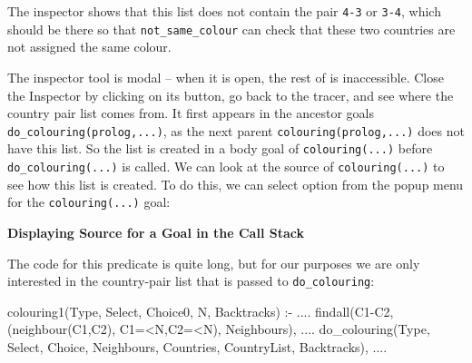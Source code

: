 The inspector shows that this list does not contain the pair \verb'4-3' or
\verb'3-4', which should be there so that \verb'not_same_colour'
can check that these two countries  are not assigned the same colour.

\begin{sloppypar}
The inspector tool is modal -- when it is open, the rest of {\tkeclipse} is
inaccessible. Close the Inspector by clicking on its
 button, go back to the tracer, and see where the country
pair list comes from. It
first appears in 
the ancestor goals \verb'do_colouring(prolog,...)', as the next parent
\verb'colouring(prolog,...)' does not have this list. So the list
is created in a body goal of \verb'colouring(...)' before \verb'do_colouring(...)' is
called. We can look at the source of \verb'colouring(...)'  to see how this
list is created. To do this, we can
select  option from the popup menu for the
\verb'colouring(...)' goal:
\end{sloppypar}
 
\begin{center}

\vspace{3mm}
{\bf Displaying Source for a Goal in the Call Stack}
\end{center}

The code for this predicate is quite long, but for our purposes we are only
interested in the country-pair list that is passed to \verb'do_colouring':

\begin{code}
colouring1(Type, Select, Choice0, N, Backtracks) :-
        ....
        findall(C1-C2, (neighbour(C1,C2), C1=<N,C2=<N), Neighbours),
        ....
        do_colouring(Type, Select, Choice, Neighbours, Countries,
                     CountryList, Backtracks), 
        ....
\end{code}

